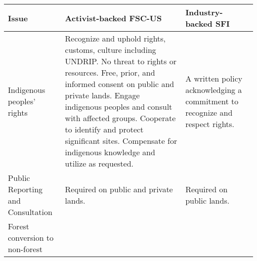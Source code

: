 \begin{table}
\caption{Qualitative Levels of Performance Required for Certification}
\label{issues}

\begin{longtable}[]{@{}lll@{}}
\toprule
\begin{minipage}[b]{0.20\columnwidth}\raggedright\strut
Issue\strut
\end{minipage} & \begin{minipage}[b]{0.36\columnwidth}\raggedright\strut
Activist-backed FSC-US\strut
\end{minipage} & \begin{minipage}[b]{0.36\columnwidth}\raggedright\strut
Industry-backed SFI\strut
\end{minipage}\tabularnewline
\midrule
\endhead
\begin{minipage}[t]{0.20\columnwidth}\raggedright\strut
Indigenous peoples' rights\strut
\end{minipage} & \begin{minipage}[t]{0.36\columnwidth}\raggedright\strut
Recognize and uphold rights, customs, culture including UNDRIP. No
threat to rights or resources. Free, prior, and informed consent on
public and private lands. Engage indigenous peoples and consult with
affected groups. Cooperate to identify and protect significant sites.
Compensate for indigenous knowledge and utilize as requested.\strut
\end{minipage} & \begin{minipage}[t]{0.36\columnwidth}\raggedright\strut
A written policy acknowledging a commitment to recognize and respect
rights.\strut
\end{minipage}\tabularnewline
\begin{minipage}[t]{0.20\columnwidth}\raggedright\strut
Public Reporting and Consultation\strut
\end{minipage} & \begin{minipage}[t]{0.36\columnwidth}\raggedright\strut
Required on public and private lands.\strut
\end{minipage} & \begin{minipage}[t]{0.36\columnwidth}\raggedright\strut
Required on public lands.\strut
\end{minipage}\tabularnewline
\begin{minipage}[t]{0.20\columnwidth}\raggedright\strut
Forest conversion to non-forest\strut
\end{minipage} & \begin{minipage}[t]{0.36\columnwidth}\raggedright\strut

\end{minipage}
\end{longtable}
\end{table}
